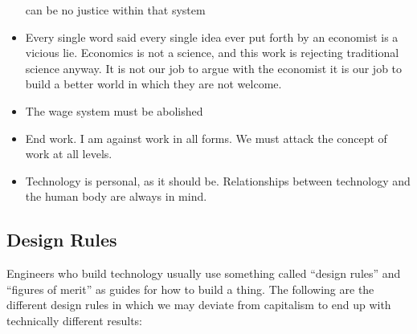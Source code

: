 \begin{itemize}
  can be no justice within that system
\item
  Every single word said every single idea ever put forth by an
  economist is a vicious lie. Economics is not a science, and this work
  is rejecting traditional science anyway. It is not our job to argue
  with the economist it is our job to build a better world in which they
  are not welcome.
\item
  The wage system must be abolished
\item
  End work. I am against work in all forms. We must attack the concept
  of work at all levels.
\item
  Technology is personal, as it should be. Relationships between
  technology and the human body are always in mind.
\end{itemize}

\subsection{Design Rules}\label{design-rules}

Engineers who build technology usually use something called ``design
rules'' and ``figures of merit'' as guides for how to build a thing. The
following are the different design rules in which we may deviate from
capitalism to end up with technically different results:

